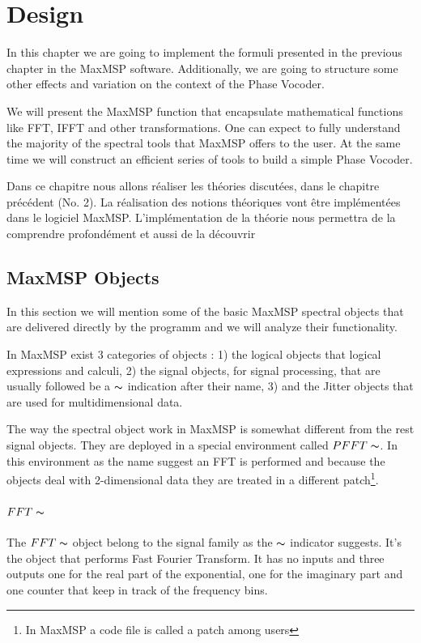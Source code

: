 \chapter{Design}

\label{ch:design}

In this chapter we are going to implement the formuli presented in the previous chapter in the MaxMSP software. Additionally, we are going to structure some other effects and variation on the context of the Phase Vocoder.

We will present the MaxMSP function that encapsulate mathematical functions like FFT, IFFT and other transformations. One can expect to fully understand the majority of the spectral tools that MaxMSP offers to the user. At the same time we will construct an efficient series of tools to build a simple Phase Vocoder.

Dans ce chapitre nous allons réaliser les théories discutées, dans le chapitre précédent (No. 2). La réalisation des notions théoriques vont être implémentées dans le logiciel MaxMSP. L'implémentation de la théorie nous permettra de la comprendre profondément et aussi de la découvrir 

\section{MaxMSP Objects}

In this section we will mention some of the basic MaxMSP spectral objects that are delivered directly by the programm and we will analyze their functionality.

In MaxMSP exist 3 categories of objects : 1) the logical objects that logical expressions and calculi, 2) the signal objects, for signal processing, that are usually followed be a $\thicksim$ indication after their name, 3) and the Jitter objects that are used for multidimensional data.

The way the spectral object work in MaxMSP is somewhat different from the rest signal objects. They are deployed in a special environment called $PFFT\thicksim$. In this environment as the name suggest an FFT is performed and because the objects deal with 2-dimensional data they are treated in a different patch\footnote{In MaxMSP a code file is called a patch among users}.

\subsubsection{$FFT\thicksim$}
    The $FFT\thicksim$ object belong to the signal family as the $\thicksim$ indicator suggests. It's the object that performs Fast Fourier Transform. It has no inputs and three outputs one for the real part of the exponential, one for the imaginary part and one counter that keep in track of the frequency bins.

